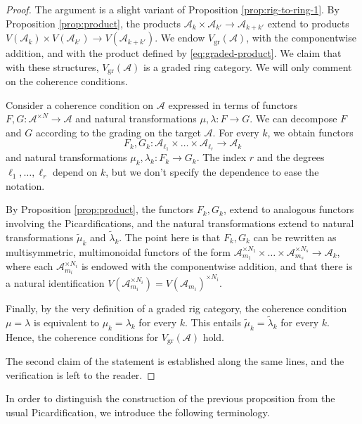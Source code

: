 \documentclass[JEP,XML,SOM,Unicode,published]{cedram}
\theoremstyle{plain}
\theoremstyle{definition}
\newcommand{\Acal}{\mathcal A}
\begin{document}
\begin{proof}
The argument is a slight variant of Proposition \ref{prop:rig-to-ring-1}. By Proposition \ref{prop:product}, the products $\Acal_{k}\times\Acal_{k'}\to\Acal_{k+k'}$ extend to products $V(\Acal_{k})\times V(\Acal_{k'})\to V(\Acal_{k+k'})$. We endow $V_{\mathrm{gr}}(\Acal)$, with the componentwise addition, and with the product defined by \eqref{eq:graded-product}. We claim that with these structures, $V_{\mathrm{gr}}(\Acal)$ is a graded ring category. We will only comment on the coherence conditions.

Consider a coherence condition on $\Acal$ expressed in terms of functors $F,G\colon\Acal^{\times N}\to\Acal$ and natural transformations $\mu,\lambda\colon F\to G$. We can decompose $F$ and $G$ according to the grading on the target $\Acal$. For every $k$, we obtain functors\vspace*{-3pt}\enlargethispage{.5\baselineskip}
\[
F_{k},G_{k}\colon \Acal_{\ell_{1}}\times\ldots\times\Acal_{\ell_{r}}\to\Acal_{k}
\]
and natural transformations $\mu_{k},\lambda_{k}\colon F_{k}\to G_{k}$. The index $r$ and the degrees $\ell_{1},\ldots,\ell_{r}$ depend on $k$, but we don't specify the dependence to ease the notation.

By Proposition \ref{prop:product}, the functors $F_{k}, G_{k}$, extend to analogous functors involving the Picardifications, and the natural transformations extend to natural transformations $\widetilde{\mu}_{k}$ and $\widetilde{\lambda}_{k}$. The point here is that $F_{k}, G_{k}$ can be rewritten as multisymmetric, multimonoidal functors of the form $\Acal_{m_{1}}^{\times N_{1}}\times\ldots\times\Acal_{m_{s}}^{\times N_{s}}\to\Acal_{k}$, where each $\Acal_{m_{i}}^{\times N_{i}}$ is endowed with the componentwise addition, and that there is a natural identification $V(\Acal_{m_{i}}^{\times N_{i}})=V(\Acal_{m_{i}})^{\times N_{i}}$.

Finally, by the very definition of a graded rig category, the coherence condition $\mu=\lambda$ is equivalent to $\mu_{k}=\lambda_{k}$ for every $k$. This entails $\widetilde{\mu}_{k}=\widetilde{\lambda}_{k}$ for every $k$. Hence, the coherence conditions for $V_{\mathrm{gr}}(\Acal)$ hold.

The second claim of the statement is established along the same lines, and the verification is left to the reader.
\end{proof}

In order to distinguish the construction of the previous proposition from the usual Picardification, we introduce the following terminology.
\end{document}
